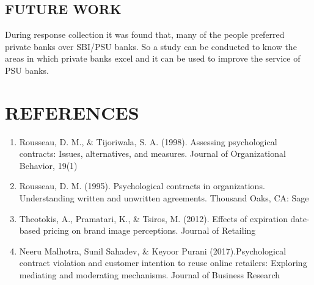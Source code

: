 \documentclass[a4paper, 14pt]{article}
\begin{document}
{\subsection{FUTURE WORK}
During response collection it was found that, many of the people preferred private banks over SBI/PSU banks. So a study can be conducted to know the areas in which private banks excel and it can be used to improve the service of PSU banks.


\newpage
\section{REFERENCES}
\begin{enumerate}
\item Rousseau, D. M., \& Tijoriwala, S. A. (1998). Assessing psychological contracts: Issues, alternatives, and measures. Journal of Organizational Behavior, 19(1)%
\item Rousseau, D. M. (1995). Psychological contracts in organizations. Understanding written and unwritten agreements. Thousand Oaks, CA: Sage
\item Theotokis, A., Pramatari, K., \& Tsiros, M. (2012). Effects of expiration date-based pricing on brand image perceptions. Journal of Retailing%
\item Neeru Malhotra, Sunil Sahadev, \& Keyoor Purani (2017).Psychological contract violation and customer intention to reuse online retailers: Exploring mediating and moderating mechanisms. Journal of Business Research%

\end{enumerate}}
\end{document}
